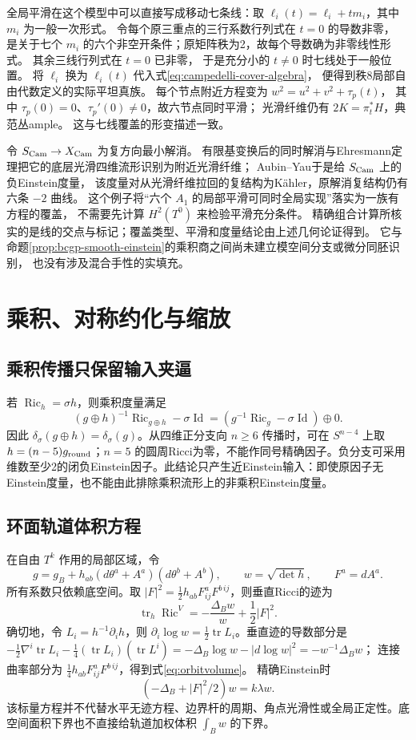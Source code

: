 \documentclass[UTF8,a4paper,11pt,fontset=fandol]{ctexart}
\numberwithin{equation}{section}
\theoremstyle{definition}
\newcommand{\Ric}{\operatorname{Ric}}
\newcommand{\tr}{\operatorname{tr}}
\newcommand{\Id}{\operatorname{Id}}
\begin{document}
全局平滑在这个模型中可以直接写成移动七条线：取
$\ell_i(t)=\ell_i+t m_i$，其中 $m_i$ 为一般一次形式。
令每个原三重点的三行系数行列式在 $t=0$ 的导数非零，
是关于七个 $m_i$ 的六个非空开条件；原矩阵秩为2，故每个导数确为非零线性形式。
其余三线行列式在 $t=0$ 已非零，
于是充分小的 $t\ne0$ 时七线处于一般位置。
将 $\ell_i$ 换为 $\ell_i(t)$ 代入式\eqref{eq:campedelli-cover-algebra}，
便得到秩8局部自由代数定义的实际平坦真族。
每个节点附近方程变为 $w^2=u^2+v^2+\tau_p(t)$，
其中 $\tau_p(0)=0$、$\tau_p'(0)\ne0$，故六节点同时平滑；
光滑纤维仍有 $2K=\pi_t^*H$，典范丛ample。
这与七线覆盖的形变描述一致\cite[\S3.3]{AlexeevPardini}。

令 $S_{\rm Cam}\to X_{\rm Cam}$ 为复方向最小解消。
有限基变换后的同时解消与Ehresmann定理把它的底层光滑四维流形识别为附近光滑纤维；
Aubin--Yau于是给 $S_{\rm Cam}$ 上的负Einstein度量，
该度量对从光滑纤维拉回的复结构为K\"ahler，原解消复结构仍有六条 $-2$ 曲线。
这个例子将“六个 $A_1$ 的局部平滑可同时全局实现”落实为一族有方程的覆盖，
不需要先计算 $H^2(T^0)$ 来检验平滑充分条件。
精确组合计算所核实的是线的交点与标记；覆盖类型、平滑和度量结论由上述几何论证得到。
它与命题\ref{prop:bcgp-smooth-einstein}的乘积商之间尚未建立模空间分支或微分同胚识别，
也没有涉及混合手性的实填充。

\appendix
\section{乘积、对称约化与缩放}
\subsection{乘积传播只保留输入夹逼}
若 $\Ric_h=\sigma h$，则乘积度量满足
\[
(g\oplus h)^{-1}\Ric_{g\oplus h}-\sigma\Id
=(g^{-1}\Ric_g-\sigma\Id)\oplus0.
\]
因此 $\delta_\sigma(g\oplus h)=\delta_\sigma(g)$。从四维正分支向 $n\ge6$ 传播时，可在 $S^{n-4}$ 上取 $h=(n-5)g_{\rm round}$；$n=5$ 的圆周Ricci为零，不能作同号精确因子。负分支可采用维数至少2的闭负Einstein因子。此结论只产生近Einstein输入：即使原因子无Einstein度量，也不能由此排除乘积流形上的非乘积Einstein度量。

\subsection{环面轨道体积方程}
在自由 $T^k$ 作用的局部区域，令
\[
g=g_B+h_{ab}(d\theta^a+A^a)(d\theta^b+A^b),\qquad
w=\sqrt{\det h},\qquad F^a=dA^a.
\]
所有系数只依赖底空间。取 $|F|^2=\frac12h_{ab}F^a_{ij}F^{b\,ij}$，则垂直Ricci的迹为
\begin{equation}\label{eq:orbitvolume}
\tr_h\Ric^V=-\frac{\Delta_Bw}{w}+\frac12|F|^2 .
\end{equation}
确切地，令 $L_i=h^{-1}\partial_i h$，则
$\partial_i\log w=\frac12\tr L_i$。垂直迹的导数部分是
$-\frac12\nabla^i\tr L_i-\frac14(\tr L_i)(\tr L^i)
=-\Delta_B\log w-|d\log w|^2=-w^{-1}\Delta_Bw$；
连接曲率部分为 $\frac14h_{ab}F^a_{ij}F^{b\,ij}$，得到式\eqref{eq:orbitvolume}。
精确Einstein时
\[
(-\Delta_B+|F|^2/2)w=k\lambda w.
\]
该标量方程并不代替水平无迹方程、边界杆的周期、角点光滑性或全局正定性。底空间面积下界也不直接给轨道加权体积 $\int_Bw$ 的下界。
\end{document}

